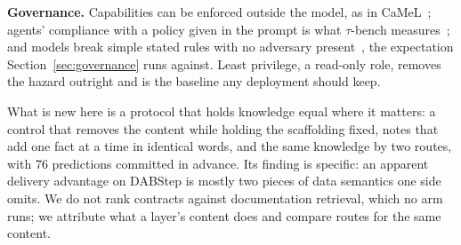 \textbf{Governance.} Capabilities can be enforced outside the model, as
in CaMeL~\cite{camel}; agents' compliance with a policy given in the
prompt is what $\tau$-bench measures~\cite{tau-bench}; and models break
simple stated rules with no adversary present~\cite{rules}, the
expectation Section~\ref{sec:governance} runs against. Least privilege, a
read-only role, removes the hazard outright and is the baseline any
deployment should keep.

What is new here is a protocol that holds knowledge equal where it
matters: a control that removes the content while holding the scaffolding
fixed, notes that add one fact at a time in identical words, and the same
knowledge by two routes, with 76 predictions committed in advance. Its
finding is specific: an apparent delivery advantage on DABStep is mostly
two pieces of data semantics one side omits. We do not rank contracts
against documentation retrieval, which no arm runs; we attribute what a
layer's content does and compare routes for the same content.
